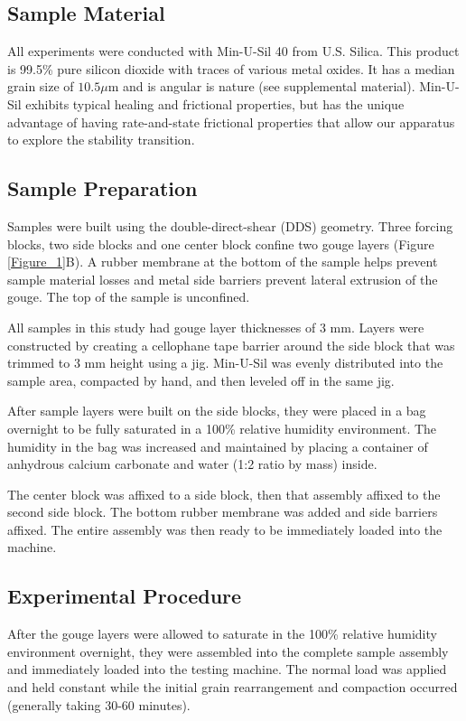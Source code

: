 \subsection{Sample Material}
All experiments were conducted with Min-U-Sil 40 from U.S. Silica. This product is 99.5\% pure silicon dioxide with traces of various metal oxides. It has a median grain size of $10.5 \mu\text{m}$  and is angular is nature (see supplemental material). Min-U-Sil exhibits typical healing and frictional properties, but has the unique advantage of having rate-and-state frictional properties that allow our apparatus to explore the stability transition. 

\subsection{Sample Preparation}
Samples were built using the double-direct-shear (DDS) geometry. Three forcing blocks, two side blocks and one center block confine two gouge layers (Figure \ref{Figure_1}B). A rubber membrane at the bottom of the sample helps prevent sample material losses and metal side barriers prevent lateral extrusion of the gouge. The top of the sample is unconfined.

All samples in this study had gouge layer thicknesses of $3$ mm. Layers were constructed by creating a cellophane tape barrier around the side block that was trimmed to $3$ mm height using a jig. Min-U-Sil was evenly distributed into the sample area, compacted by hand, and then leveled off in the same jig. 

After sample layers were built on the side blocks, they were placed in a bag overnight to be fully saturated in a 100\% relative humidity environment. The humidity in the bag was increased and maintained by placing a container of anhydrous calcium carbonate and water (1:2 ratio by mass) inside. 

The center block was affixed to a side block, then that assembly affixed to the second side block. The bottom rubber membrane was added and side barriers affixed. The entire assembly was then ready to be immediately loaded into the machine.

\subsection{Experimental Procedure}
After the gouge layers were allowed to saturate in the 100\% relative humidity environment overnight, they were assembled into the complete sample assembly and immediately loaded into the testing machine. The normal load was applied and held constant while the initial grain rearrangement and compaction occurred (generally taking 30-60 minutes). 

